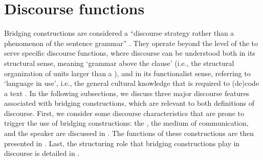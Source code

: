 \documentclass[output=paper]{LSP/langsci}
\begin{document}
\section{Discourse functions} 
\label{GuAi4discourse}
Bridging constructions are considered a ``discourse strategy rather than a phenomenon of the sentence grammar'' \citep[][364]{devries.2005}. They operate beyond the level of the  to serve specific discourse functions, where discourse can be understood both in its structural sense, meaning `grammar above the clause' (i.e., the structural organization of units larger than a ), and in its functionalist sense, referring to `language in use', i.e., the general cultural knowledge that is required to (de)code a text \citep[][10--13]{cameron01}. In the following subsections, we discuss three major discourse features associated with bridging constructions, which are relevant to both definitions of discourse. First, we consider some discourse characteristics that are prone to trigger the use of bridging constructions: the , the medium of communication, and the speaker are discussed in . The  functions of these constructions are then presented in . Last, the structuring role that bridging constructions play in discourse is detailed in . 
\end{document}
